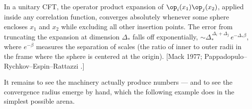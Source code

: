 \begin{ttheorem}
\label{thm:ope-convergence}
In a unitary CFT, the operator product expansion of $\op_i(x_1)\op_j(x_2)$,
applied inside any correlation function, converges absolutely whenever some
sphere encloses $x_1$ and $x_2$ while excluding all other insertion points.
The error from truncating the expansion at dimension $\Delta_*$ falls off
exponentially, $\sim \Delta_*^{\,\Delta_i+\Delta_j}\,e^{-\Delta_* \beta}$,
where $e^{-\beta}$ measures the separation of scales (the ratio of inner to
outer radii in the frame where the sphere is centered at the origin). [Mack
1977; Pappadopulo--Rychkov--Espin--Rattazzi .]
\end{ttheorem}

\noin It remains to see the machinery actually produce numbers --- and to see
the convergence radius emerge by hand, which the following example does in the
simplest possible arena.

